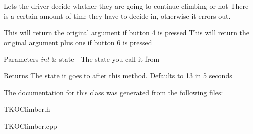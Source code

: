 \-Lets the driver decide whether they are going to continue climbing or not \-There is a certain amount of time they have to decide in, otherwise it errors out.

\-This will return the original argument if button 4 is pressed \-This will return the original argument plus one if button 6 is pressed


\begin{DoxyParams}{\-Parameters}
{\em int} & state -\/ \-The state you call it from \\
\hline
\end{DoxyParams}
\begin{DoxyReturn}{\-Returns}
\-The state it goes to after this method. \-Defaults to 13 in 5 seconds 
\end{DoxyReturn}


\-The documentation for this class was generated from the following files\-:\begin{DoxyCompactItemize}
\item 
\-T\-K\-O\-Climber.\-h\item 
\-T\-K\-O\-Climber.\-cpp\end{DoxyCompactItemize}
